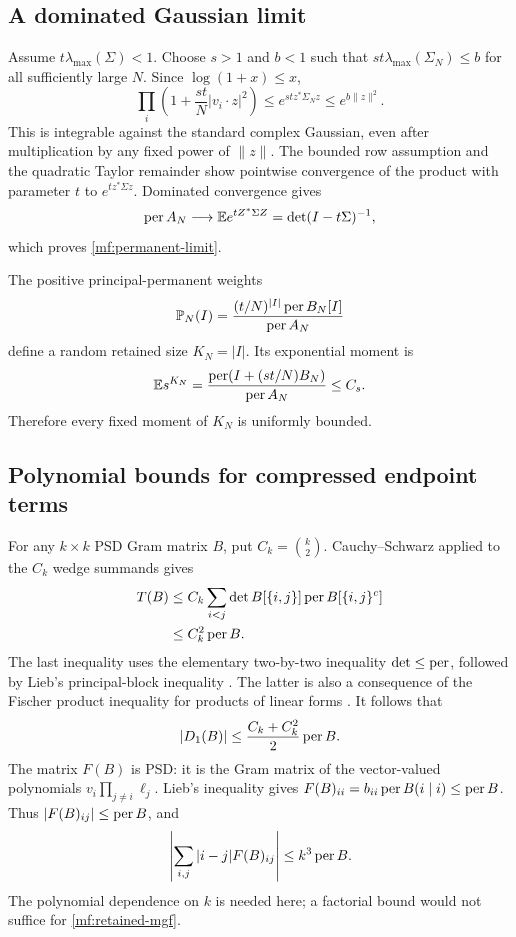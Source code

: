 \subsection{A dominated Gaussian limit}

Assume \(t\lambda_{\max}(\Sigma)<1\). Choose \(s>1\) and \(b<1\)
such that \(st\lambda_{\max}(\Sigma_N)\le b\) for all sufficiently
large \(N\). Since \(\log(1+x)\le x\),
\[
 \prod_i\left(1+\frac{st}{N}|v_i\cdot z|^2\right)
 \le e^{stz^*\Sigma_Nz}\le e^{b\|z\|^2}.
\]
This is integrable against the standard complex Gaussian, even after
multiplication by any fixed power of \(\|z\|\).
The bounded row assumption and the quadratic Taylor remainder show
pointwise convergence of the product with parameter \(t\) to
\(e^{tz^*\Sigma z}\). Dominated convergence gives
\[
 \operatorname{per} A_N\longrightarrow
 \mathbb E e^{tZ^*\Sigma Z}=\det(I-t\Sigma)^{-1},
\]
which proves \eqref{mf:permanent-limit}.

The positive principal-permanent weights
\[
 \mathbb P_N(I)=
 \frac{(t/N)^{|I|}\operatorname{per} B_N[I]}{\operatorname{per} A_N}
\]
define a random retained size \(K_N=|I|\). Its exponential moment is
\begin{equation}\label{mf:retained-mgf}
 \mathbb E s^{K_N}
 =\frac{\operatorname{per}(I+(st/N)B_N)}{\operatorname{per} A_N}\le C_s.
\end{equation}
Therefore every fixed moment of \(K_N\) is uniformly bounded.

\subsection{Polynomial bounds for compressed endpoint terms}

For any \(k\times k\) PSD Gram matrix \(B\), put \(C_k=\binom k2\).
Cauchy--Schwarz applied to the \(C_k\) wedge summands gives
\begin{align}
 T(B)
 &\le C_k\sum_{i<j}
       \det B[\{i,j\}]\operatorname{per} B[\{i,j\}^c]\notag\\
 &\le C_k^2\operatorname{per} B.\label{mf:wedge-bound}
\end{align}
The last inequality uses the elementary two-by-two inequality
\(\det\le\operatorname{per}\), followed by Lieb's principal-block inequality
\cite{Lieb1966}. The latter is also a consequence of the Fischer product
inequality for products of linear forms \cite{Reznick1993}.
It follows that
\begin{equation}\label{mf:derivative-bound}
 |D_1(B)|\le\frac{C_k+C_k^2}{2}\operatorname{per} B.
\end{equation}
The matrix \(F(B)\) is PSD: it is the Gram matrix of the vector-valued
polynomials \(v_i\prod_{j\ne i}\ell_j\).
Lieb's inequality gives
\(F(B)_{ii}=b_{ii}\operatorname{per} B(i\mid i)\le\operatorname{per} B\).
Thus \(|F(B)_{ij}|\le\operatorname{per} B\), and
\begin{equation}\label{mf:footrule-bound}
 \left|\sum_{i,j}|i-j|F(B)_{ij}\right|\le k^3\operatorname{per} B.
\end{equation}
The polynomial dependence on \(k\) is needed here; a factorial bound
would not suffice for \eqref{mf:retained-mgf}.

